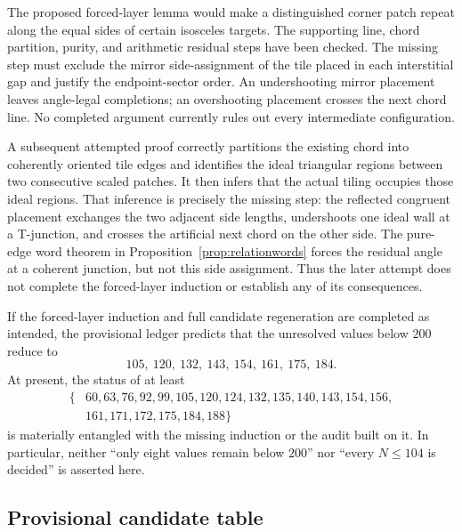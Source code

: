 \documentclass[11pt]{amsart}
\theoremstyle{definition}
\theoremstyle{remark}
\begin{document}
The proposed forced-layer lemma would make a distinguished corner patch
repeat along the equal sides of certain isosceles targets.  The supporting
line, chord partition, purity, and arithmetic residual steps have been
checked.  The missing step must exclude the mirror side-assignment of the
tile placed in each interstitial gap and justify the endpoint-sector order.
An undershooting mirror placement leaves angle-legal completions; an
overshooting placement crosses the next chord line.  No completed argument
currently rules out every intermediate configuration.

A subsequent attempted proof correctly partitions the existing chord into
coherently oriented tile edges and identifies the ideal triangular regions
between two consecutive scaled patches.  It then infers that the actual
tiling occupies those ideal regions.  That inference is precisely the
missing step: the reflected congruent placement exchanges the two adjacent
side lengths, undershoots one ideal wall at a T-junction, and crosses the
artificial next chord on the other side.  The pure-edge word theorem in
Proposition~\ref{prop:relationwords} forces the residual angle at a coherent
junction, but not this side assignment.  Thus the later attempt does not
complete the forced-layer induction or establish any of its consequences.

If the forced-layer induction and full candidate regeneration are completed
as intended, the provisional ledger predicts that the unresolved values below
$200$ reduce to
\[
             105,\ 120,\ 132,\ 143,\ 154,\ 161,\ 175,\ 184.
\]
At present, the status of at least
\[
\begin{split}
\{&60,63,76,92,99,105,120,124,132,135,140,143,154,156,\\
  &161,171,172,175,184,188\}
\end{split}
\]
is materially entangled with the missing induction or the audit built on it.
In particular, neither ``only eight values remain below $200$'' nor ``every
$N\le104$ is decided'' is asserted here.

\subsection{Provisional candidate table}\label{app:conditional-table}
\end{document}
